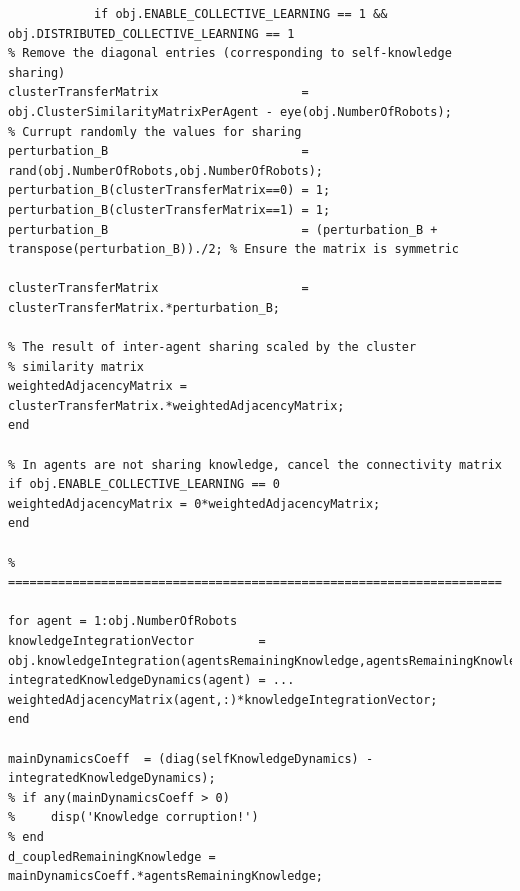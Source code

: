 \documentclass[12pt]{article}
\begin{document}
\begin{verbatim}
            if obj.ENABLE_COLLECTIVE_LEARNING == 1 && obj.DISTRIBUTED_COLLECTIVE_LEARNING == 1
% Remove the diagonal entries (corresponding to self-knowledge sharing)
clusterTransferMatrix                    = obj.ClusterSimilarityMatrixPerAgent - eye(obj.NumberOfRobots);                       
% Currupt randomly the values for sharing
perturbation_B                           = rand(obj.NumberOfRobots,obj.NumberOfRobots);
perturbation_B(clusterTransferMatrix==0) = 1;
perturbation_B(clusterTransferMatrix==1) = 1;
perturbation_B                           = (perturbation_B + transpose(perturbation_B))./2; % Ensure the matrix is symmetric

clusterTransferMatrix                    = clusterTransferMatrix.*perturbation_B;

% The result of inter-agent sharing scaled by the cluster
% similarity matrix
weightedAdjacencyMatrix = clusterTransferMatrix.*weightedAdjacencyMatrix;
end

% In agents are not sharing knowledge, cancel the connectivity matrix
if obj.ENABLE_COLLECTIVE_LEARNING == 0
weightedAdjacencyMatrix = 0*weightedAdjacencyMatrix;
end

% =====================================================================

for agent = 1:obj.NumberOfRobots
knowledgeIntegrationVector         = obj.knowledgeIntegration(agentsRemainingKnowledge,agentsRemainingKnowledge(agent));
integratedKnowledgeDynamics(agent) = ...
weightedAdjacencyMatrix(agent,:)*knowledgeIntegrationVector;
end

mainDynamicsCoeff  = (diag(selfKnowledgeDynamics) - integratedKnowledgeDynamics);
% if any(mainDynamicsCoeff > 0)
%     disp('Knowledge corruption!')
% end
d_coupledRemainingKnowledge = mainDynamicsCoeff.*agentsRemainingKnowledge;
\end{verbatim}
\end{document}
